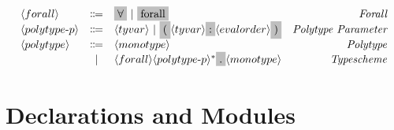 \[\begin{array}{lclr}
    \nonterminal{forall} & \Coloneqq & \terminal{$\forall$}\ |\ \terminal{forall} & \emph{Forall} \\
    \nonterminal{polytype$-$p} & \Coloneqq & \nonterminal{tyvar}\ |\ \terminal{(} \nonterminal{tyvar} \terminal{:} \nonterminal{evalorder}\terminal{)} & \emph{Polytype Parameter} \\
    \nonterminal{polytype} & \Coloneqq & \nonterminal{monotype} & \emph{Polytype} \\
    & | & \nonterminal{forall} \nonterminal{polytype$-$p}^{\ast}\terminal{.} \nonterminal{monotype} & \emph{Typescheme} \\
  \end{array}
\]

\section{Declarations and Modules}


